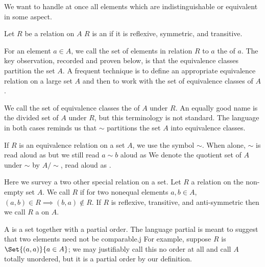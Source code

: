 
\sbasic





\sstart



We want to handle at once all elements which are indistinguishable or equivalent in some aspect.


Let $R$ be a relation on $A$
$R$ is an  if it is reflexive, symmetric, and transitive.

For an element $a \in A$, we call the set of elements in relation $R$ to $a$ the  of $a$.
The key observation, recorded and proven below, is that the equivalence classes partition the set $A$.
A frequent technique is to define an appropriate equivalence relation on a large set $A$ and then to work with the set of equivalence classes of $A$.

We call the set of equivalence classes the  of $A$ under $R$.
An equally good name is the divided set of $A$ under $R$, but this terminology is not standard.
The language in both cases reminds us that $\sim$ partitions the set $A$ into equivalence classes.

If $R$ is an equivalence relation on a set $A$, we use the symbol $\sim$.
When alone, $\sim$ is read aloud as  but we still read $a \sim b$ aloud as 
We denote the quotient set of  $A$ under $\sim$ by $A/\sim$, read aloud as .



Here we survey a two other special relation on a set.
Let $R$ a relation on the non-empty set $A$.
We call $R$  if for two nonequal elements $a, b \in A$, $(a, b) \in R \implies (b, a) \not\in R$.
If $R$ is reflexive, transitive, and anti-symmetric then we call $R$ a  on $A$.

A  is a set together with a partial order.
The language partial is meant to suggest that two elements need not be comparable.j
For example, suppose $R$ is $\Set{(a,a)}{a \in A}$; we may justifiably call this no order at all and call $A$ totally unordered, but it is a partial order by our definition.

